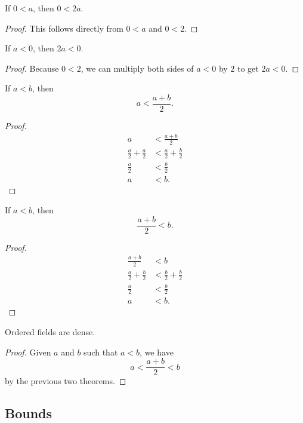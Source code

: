 \documentclass[../../math.tex]{subfiles}
\begin{document}
\begin{theorem}
    If $0 < a$, then $0 < 2a$.
\end{theorem}
\begin{proof}
    This follows directly from $0 < a$ and $0 < 2$.
\end{proof}

\begin{theorem}
    If $a < 0$, then $2a < 0$.
\end{theorem}
\begin{proof}
    Because $0 < 2$, we can multiply both sides of $a < 0$ by $2$ to get $2a <
    0$.
\end{proof}

\begin{theorem}
    If $a < b$, then
    \[
        a < \frac{a + b}{2}.
    \]
\end{theorem}
\begin{proof}
    \begin{align*}
        a &< \frac{a + b}{2} \\
        \frac{a}{2} + \frac{a}{2} &< \frac{a}{2} + \frac{b}{2} \\
        \frac{a}{2} &< \frac{b}{2} \\
        a &< b.
    \end{align*}
\end{proof}

\begin{theorem}
    If $a < b$, then
    \[
        \frac{a + b}{2} < b.
    \]
\end{theorem}
\begin{proof}
    \begin{align*}
        \frac{a + b}{2} &< b \\
        \frac{a}{2} + \frac{b}{2} &< \frac{b}{2} + \frac{b}{2} \\
        \frac{a}{2} &< \frac{b}{2} \\
        a &< b.
    \end{align*}
\end{proof}

\begin{instance}
    Ordered fields are dense.
\end{instance}
\begin{proof}
    Given $a$ and $b$ such that $a < b$, we have
    \[
        a < \frac{a + b}{2} < b
    \]
    by the previous two theorems.
\end{proof}

\subsection{Bounds}
\end{document}
